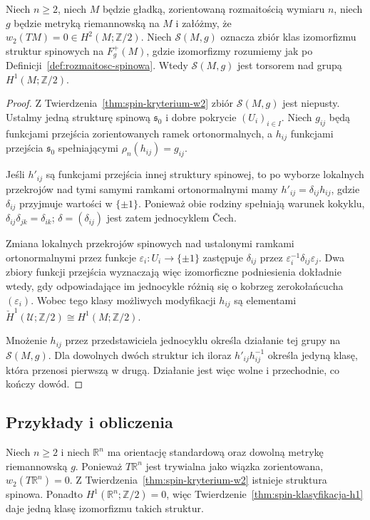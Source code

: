 \begin{twierdzenie}
\label{thm:spin-klasyfikacja-h1}
Niech $n\geq2$, niech $M$ będzie gładką, zorientowaną
rozmaitością wymiaru $n$, niech $g$ będzie metryką
riemannowską na $M$ i załóżmy, że
$w_2(TM)=0\in H^2(M;\mathbb Z/2)$.
Niech $\mathcal S(M,g)$ oznacza zbiór klas izomorfizmu
struktur spinowych na $F^+_g(M)$, gdzie izomorfizmy
rozumiemy jak po Definicji~\ref{def:rozmaitosc-spinowa}.
Wtedy $\mathcal S(M,g)$ jest torsorem nad grupą
$H^1(M;\mathbb Z/2)$.
\end{twierdzenie}
\begin{proof}
Z Twierdzenia~\ref{thm:spin-kryterium-w2} zbiór
$\mathcal S(M,g)$ jest niepusty. Ustalmy jedną
strukturę spinową $\mathfrak s_0$ i dobre pokrycie
$(U_i)_{i\in I}$. Niech $g_{ij}$ będą funkcjami
przejścia zorientowanych ramek ortonormalnych,
a $h_{ij}$ funkcjami przejścia $\mathfrak s_0$
spełniającymi $\rho_n(h_{ij})=g_{ij}$.

Jeśli $h'_{ij}$ są funkcjami przejścia innej
struktury spinowej, to po wyborze lokalnych
przekrojów nad tymi samymi ramkami ortonormalnymi
mamy $h'_{ij}=\delta_{ij}h_{ij}$, gdzie
$\delta_{ij}$ przyjmuje wartości w $\{\pm1\}$.
Ponieważ obie rodziny spełniają warunek kokyklu,
$\delta_{ij}\delta_{jk}=\delta_{ik}$;
$\delta=(\delta_{ij})$ jest zatem jednocyklem \v{C}ech.

Zmiana lokalnych przekrojów spinowych nad ustalonymi
ramkami ortonormalnymi przez funkcje
$\varepsilon_i:U_i\to\{\pm1\}$ zastępuje
$\delta_{ij}$ przez
$\varepsilon_i^{-1}\delta_{ij}\varepsilon_j$.
Dwa zbiory funkcji przejścia wyznaczają więc
izomorficzne podniesienia dokładnie wtedy,
gdy odpowiadające im jednocykle różnią się
o kobrzeg zerokołańcucha $(\varepsilon_i)$. Wobec tego klasy możliwych
modyfikacji $h_{ij}$ są elementami
$\check H^1(\mathcal U;\mathbb Z/2)
\cong H^1(M;\mathbb Z/2)$.

Mnożenie $h_{ij}$ przez przedstawiciela jednocyklu
określa działanie tej grupy na $\mathcal S(M,g)$.
Dla dowolnych dwóch struktur ich iloraz
$h'_{ij}h_{ij}^{-1}$ określa jedyną klasę,
która przenosi pierwszą w drugą. Działanie
jest więc wolne i przechodnie, co kończy dowód.
\end{proof}

\subsection{Przykłady i obliczenia}

\begin{przyklad}
Niech $n\geq2$ i niech $\mathbb R^n$ ma orientację
standardową oraz dowolną metrykę riemannowską $g$.
Ponieważ $T\mathbb R^n$ jest trywialna jako wiązka
zorientowana, $w_2(T\mathbb R^n)=0$.
Z Twierdzenia~\ref{thm:spin-kryterium-w2} istnieje
struktura spinowa. Ponadto
$H^1(\mathbb R^n;\mathbb Z/2)=0$, więc
Twierdzenie~\ref{thm:spin-klasyfikacja-h1} daje
jedną klasę izomorfizmu takich struktur.
\end{przyklad}

